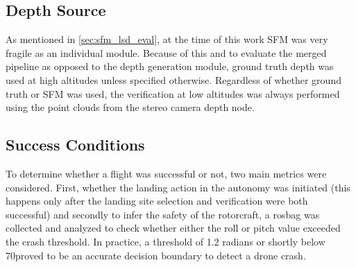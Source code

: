 \subsection{Depth Source}
As mentioned in \cref{sec:sfm_lsd_eval}, at the time of this work SFM was very fragile as an individual module. Because of this and to evaluate the merged pipeline as opposed to the depth generation module, ground truth depth was used at high altitudes unless specified otherwise. Regardless of whether ground truth or SFM was used, the verification at low altitudes was always performed using the point clouds from the stereo camera depth node.

\subsection{Success Conditions}
To determine whether a flight was successful or not, two main metrics were considered. First, whether the landing action in the autonomy was initiated (this happens only after the landing site selection and verification were both successful) and secondly to infer the safety of the rotorcraft, a rosbag was collected and analyzed to check whether either the roll or pitch value exceeded the crash threshold. In practice, a threshold of 1.2 radians or shortly below 70\degree proved to be an accurate decision boundary to detect a drone crash.

